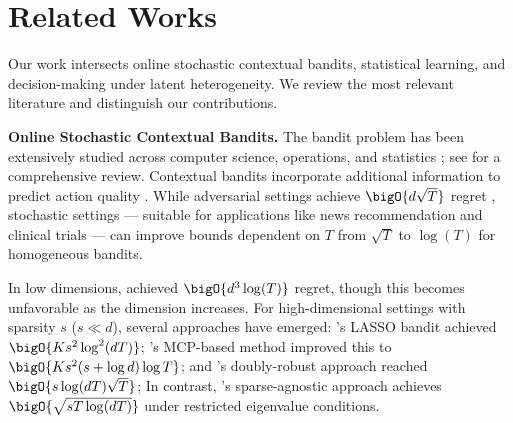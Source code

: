 \section{Related Works}
\label{sec:related-works}

Our work intersects online stochastic contextual bandits, statistical learning, and decision-making under latent heterogeneity. We review the most relevant literature and distinguish our contributions.

\smallskip
\noindent
\textbf{Online Stochastic Contextual Bandits.}
The bandit problem has been extensively studied across computer science, operations, and statistics \citep{li2019dimension, russo2020simple,chen2021multi, russo2022satisficing, si2023distributionally,simchi2023regret,ren2024dynamic,tang2024stochastic,chen2025express}; see \cite{lattimore2020bandit} for a comprehensive review. Contextual bandits incorporate additional information to predict action quality \citep{auer2002using,dani2008stochastic,li2010contextual,chu2011contextual,ji2022risk}. While adversarial settings achieve $\bigO{d\sqrt{T}}$ regret \citep{abbasi2011improved}, stochastic settings --- suitable for applications like news recommendation and clinical trials --- can improve bounds dependent on $T$ from $\sqrt{T}$ to $\log(T)$ for homogeneous bandits.

In low dimensions, \cite{goldenshluger2013linear} achieved $\bigO{d^3\log(T)}$ regret, though this becomes unfavorable as the dimension increases. For high-dimensional settings with sparsity $s$ ($s \ll d$), several approaches have emerged: \cite{bastani2020online}'s LASSO bandit achieved $\bigO{K s^2 \log^2(dT)}$; %
\cite{wang2024online}'s MCP-based method improved this to $\bigO{Ks^2(s+\log d)\log T}$; and \cite{kim2019doubly}'s doubly-robust approach reached $\bigO{s\log(dT)\sqrt{T}}$; %
In contrast, \cite{oh2020sparsity}'s sparse-agnostic approach achieves %
$\bigO{\sqrt{sT\log(dT)}}$ under restricted eigenvalue conditions. 

